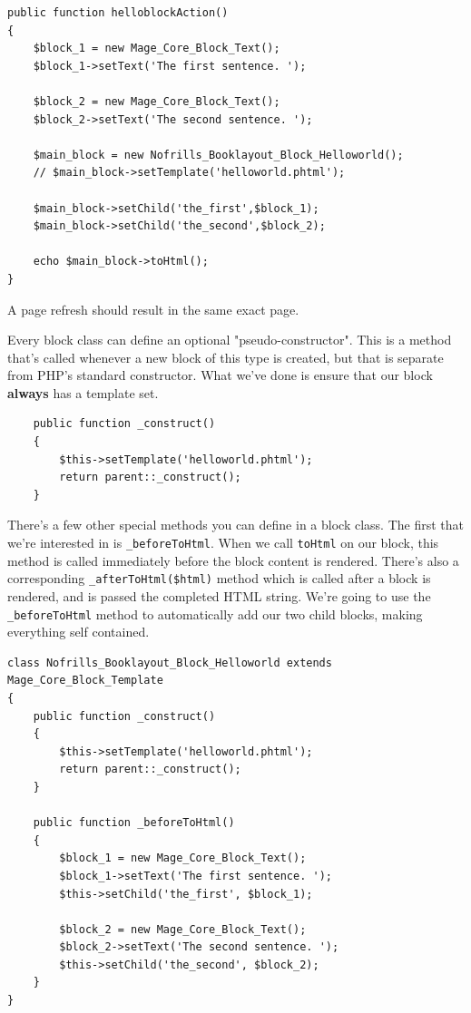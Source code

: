\documentclass[oneside]{book}
\begin{document}
\begin{lstlisting}
public function helloblockAction()
{   
    $block_1 = new Mage_Core_Block_Text();
    $block_1->setText('The first sentence. ');

    $block_2 = new Mage_Core_Block_Text();
    $block_2->setText('The second sentence. ');     

    $main_block = new Nofrills_Booklayout_Block_Helloworld();
    // $main_block->setTemplate('helloworld.phtml');            

    $main_block->setChild('the_first',$block_1);
    $main_block->setChild('the_second',$block_2);

    echo $main_block->toHtml();
}

\end{lstlisting}


A page refresh should result in the same exact page.

Every block class can define an optional "pseudo-constructor".  This is a method that's called whenever a new block of this type is created, but that is separate from PHP's standard constructor.  What we've done is ensure that our block \textbf{always} has a template set.

\begin{lstlisting}
    public function _construct()
    {
        $this->setTemplate('helloworld.phtml');
        return parent::_construct();
    }

\end{lstlisting}


There's a few  other special methods you can define in a block class.  The first that we're interested in is \footnotesize\texttt{\_beforeToHtml}\normalsize.  When we call \footnotesize\texttt{toHtml} \normalsize  on our block, this method is called immediately before the block content is rendered.  There's also a corresponding \footnotesize\texttt{\_afterToHtml(\$html)} \normalsize  method which is called after a block is rendered, and is passed the completed HTML string.  We're going to use the \footnotesize\texttt{\_beforeToHtml} \normalsize  method to automatically add our two child blocks, making everything self contained.

\begin{lstlisting}
class Nofrills_Booklayout_Block_Helloworld extends Mage_Core_Block_Template
{
    public function _construct()
    {
        $this->setTemplate('helloworld.phtml');
        return parent::_construct();
    }

    public function _beforeToHtml()
    {
        $block_1 = new Mage_Core_Block_Text();
        $block_1->setText('The first sentence. ');
        $this->setChild('the_first', $block_1);     

        $block_2 = new Mage_Core_Block_Text();
        $block_2->setText('The second sentence. ');     
        $this->setChild('the_second', $block_2);        
    }
}   

\end{lstlisting}
\end{document}
